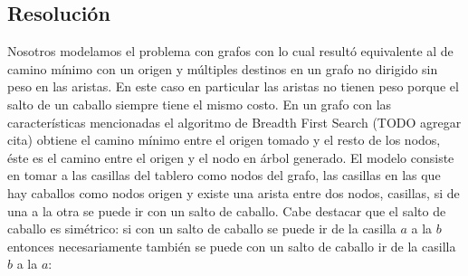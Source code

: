 \subsection{Resolución}
Nosotros modelamos el problema con grafos con lo cual resultó equivalente al de camino mínimo 
con un origen y múltiples destinos en un grafo no dirigido sin peso en las aristas. 
En este caso en particular las aristas no tienen peso porque el salto de un caballo siempre 
tiene el mismo costo. En un grafo con las características mencionadas el algoritmo de 
Breadth First Search (TODO agregar cita) obtiene el camino mínimo entre el origen tomado y el resto de los nodos,
éste es el camino entre el origen y el nodo en árbol generado.
El modelo consiste en tomar a las casillas del tablero como nodos del grafo, las casillas en las que 
hay caballos como nodos origen y existe una arista entre dos nodos, casillas, si de una a la otra se
puede ir con un salto de caballo. Cabe destacar que el salto de caballo es simétrico: si con un salto
de caballo se puede ir de la casilla $a$ a la $b$ entonces necesariamente también se puede con un 
salto de caballo ir de la casilla $b$ a la $a$:\\
